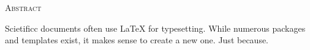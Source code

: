 \begin{center}
  \textsc{Abstract}
\end{center}
%
\noindent
%
Scietificc documents often use \LaTeX{} for typesetting. While numerous
packages and templates exist, it makes sense to create a new one. Just
because.
